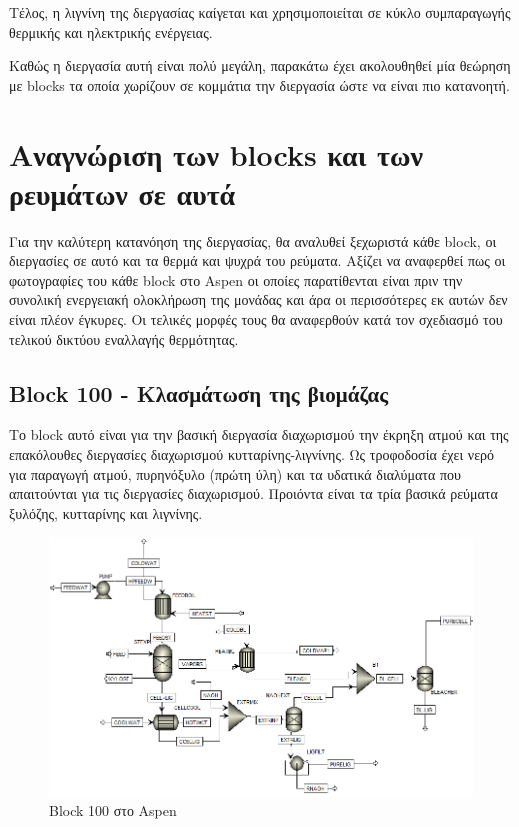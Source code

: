 \documentclass[11pt]{article}
\begin{document}
Τέλος, η λιγνίνη της διεργασίας καίγεται και χρησιμοποιείται σε κύκλο συμπαραγωγής θερμικής και ηλεκτρικής ενέργειας.

Καθώς η διεργασία αυτή είναι πολύ μεγάλη, παρακάτω έχει ακολουθηθεί μία θεώρηση με blocks τα οποία χωρίζουν σε κομμάτια την διεργασία ώστε να είναι πιο κατανοητή.

\section{Αναγνώριση των blocks και των ρευμάτων σε αυτά}
\label{sec:orge33a860}
Για την καλύτερη κατανόηση της διεργασίας, θα αναλυθεί ξεχωριστά κάθε block, οι διεργασίες σε αυτό και τα θερμά και ψυχρά του ρεύματα. Αξίζει να αναφερθεί πως οι φωτογραφίες του κάθε block στο Aspen οι οποίες παρατίθενται είναι πριν την συνολική ενεργειακή ολοκλήρωση της μονάδας και άρα οι περισσότερες εκ αυτών δεν είναι πλέον έγκυρες. Οι τελικές μορφές τους θα αναφερθούν κατά τον σχεδιασμό του τελικού δικτύου εναλλαγής θερμότητας.

\subsection{Block 100 - Κλασμάτωση της βιομάζας}
\label{sec:org95f9c56}
Το block αυτό είναι για την βασική διεργασία διαχωρισμού την έκρηξη ατμού και της επακόλουθες διεργασίες διαχωρισμού κυτταρίνης-λιγνίνης. Ως τροφοδοσία έχει νερό για παραγωγή ατμού, πυρηνόξυλο (πρώτη ύλη) και τα υδατικά διαλύματα που απαιτούνται για τις διεργασίες διαχωρισμού. Προιόντα είναι τα τρία βασικά ρεύματα ξυλόζης, κυτταρίνης και λιγνίνης.

\begin{figure}[htbp]
\centering
\includegraphics[width=.9\linewidth]{Block_100_-_Διαχωρισμός_των_τριών_κομματιών_της_βιομάζας/2023-03-11_15-21-38_screenshot.png}
\caption{Block 100 στο Aspen}
\end{figure}
\end{document}
